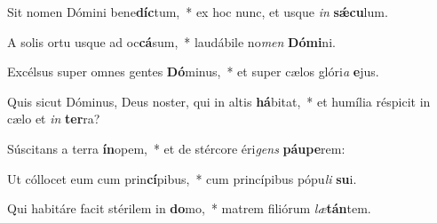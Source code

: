 \item Sit nomen Dómini bene\textbf{díc}tum,~* ex hoc nunc, et usque \textit{in} \textbf{sǽ}\textbf{cu}lum.
\item A solis ortu usque ad oc\textbf{cá}sum,~* laudábile no\textit{men} \textbf{Dó}\textbf{mi}ni.
\item Excélsus super omnes gentes \textbf{Dó}minus,~* et super cælos glóri\textit{a} \textbf{e}jus.
\item Quis sicut Dóminus, Deus noster, qui in altis \textbf{há}bitat,~* et humília réspicit in cælo et \textit{in} \textbf{ter}ra?
\item Súscitans a terra \textbf{ín}opem,~* et de stércore éri\textit{gens} \textbf{páu}\textbf{pe}rem:
\item Ut cóllocet eum cum prin\textbf{cí}pibus,~* cum princípibus pópu\textit{li} \textbf{su}i.
\item Qui habitáre facit stérilem in \textbf{do}mo,~* matrem filiórum \textit{læ}\textbf{tán}tem.
